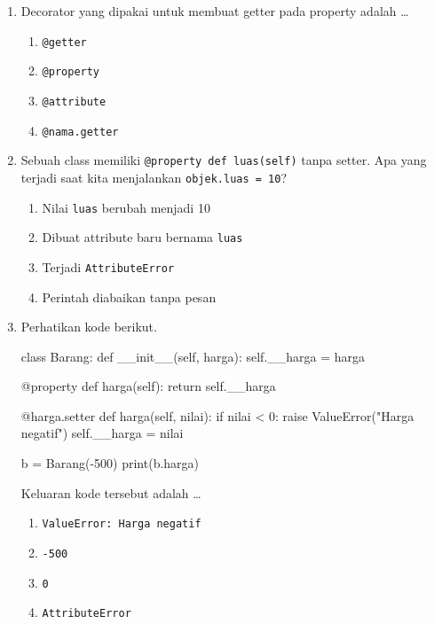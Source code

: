 \begin{enumerate}
\begin{kode}[Soal 5]
a = A()
a.__x = 99
print(a.get_x())
\end{kode}
  Keluaran kode tersebut adalah \ldots
  \begin{enumerate}[label=\alph*.,itemsep=0pt]
    \item \texttt{1}
    \item \texttt{99}
    \item \texttt{AttributeError}
    \item \texttt{None}
  \end{enumerate}

  \item Decorator yang dipakai untuk membuat getter pada property adalah \ldots
  \begin{enumerate}[label=\alph*.,itemsep=0pt]
    \item \texttt{@getter}
    \item \texttt{@property}
    \item \texttt{@attribute}
    \item \texttt{@nama.getter}
  \end{enumerate}

  \item Sebuah class memiliki \texttt{@property def luas(self)} tanpa setter. Apa yang terjadi saat kita menjalankan \texttt{objek.luas = 10}?
  \begin{enumerate}[label=\alph*.,itemsep=0pt]
    \item Nilai \texttt{luas} berubah menjadi 10
    \item Dibuat attribute baru bernama \texttt{luas}
    \item Terjadi \texttt{AttributeError}
    \item Perintah diabaikan tanpa pesan
  \end{enumerate}

  \item Perhatikan kode berikut.
\begin{kode}[Soal 8]
class Barang:
    def __init__(self, harga):
        self.__harga = harga

    @property
    def harga(self):
        return self.__harga

    @harga.setter
    def harga(self, nilai):
        if nilai < 0:
            raise ValueError("Harga negatif")
        self.__harga = nilai

b = Barang(-500)
print(b.harga)
\end{kode}
  Keluaran kode tersebut adalah \ldots
  \begin{enumerate}[label=\alph*.,itemsep=0pt]
    \item \texttt{ValueError: Harga negatif}
    \item \texttt{-500}
    \item \texttt{0}
    \item \texttt{AttributeError}
  \end{enumerate}


\end{enumerate}
